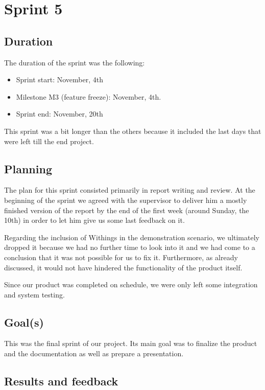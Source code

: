 

\chapter{Sprint 5}
\label{Sprint0}

\section{Duration}
The duration of the sprint was the following:
\begin{itemize}
\item Sprint start:  November, 4th
\item Milestone M3 (feature freeze): November, 4th.
\item Sprint end: November, 20th
\end{itemize}

This sprint was a bit longer than the others because it included the last days
that were left till the end project.

\section{Planning}

The plan for this sprint consisted primarily in report writing and review.
At the beginning of the sprint we agreed with the supervisor to deliver him a mostly
finished version of the report by the end of the first week (around Sunday, the 10th)
in order to let him give us some last feedback on it.

Regarding the inclusion of Withings in the demonstration scenario, we ultimately
dropped it because we had no further time to look into it and we had
come to a conclusion that it was not possible for us to fix it.
Furthermore, as already discussed, it would not have hindered the functionality
of the product itself.

Since our product was completed on schedule, we were only left some
integration and system testing.

\section{Goal(s)}

This was the final sprint of our project. Its main goal was to
finalize the product and the documentation as well as prepare a presentation.

\section{Results and feedback}

